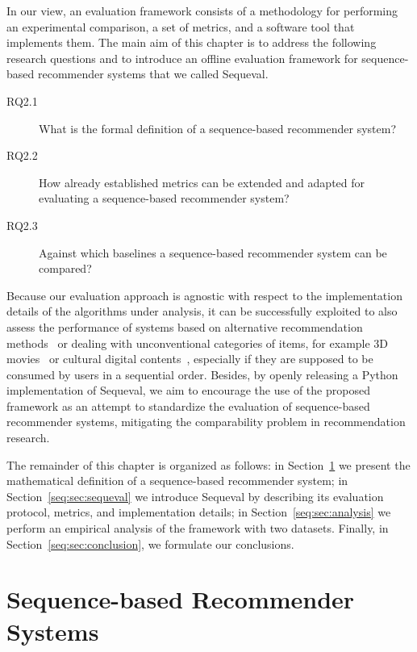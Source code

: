 In our view, an evaluation framework consists of a methodology for performing an experimental comparison, a set of metrics, and a software tool that implements them. The main aim of this chapter is to address the following research questions and to introduce an offline evaluation framework for sequence-based recommender systems that we called Sequeval.

\begin{description}
\item[RQ2.1\label{seq:itm:rq1}] What is the formal definition of a sequence-based recommender system?
\item[RQ2.2\label{seq:itm:rq2}] How already established metrics can be extended and adapted for evaluating a sequence-based recommender system?
\item[RQ2.3\label{seq:itm:rq3}] Against which baselines a sequence-based recommender system can be compared?
\end{description}

Because our evaluation approach is agnostic with respect to the implementation details of the algorithms under analysis, it can be successfully exploited to also assess the performance of systems based on alternative recommendation methods~\cite{Costa2011} or dealing with unconventional categories of items, for example 3D movies~\cite{Pouli2015} or cultural digital contents~\cite{Albanese2011}, especially if they are supposed to be consumed by users in a sequential order. Besides, by openly releasing a Python implementation of Sequeval, we aim to encourage the use of the proposed framework as an attempt to standardize the evaluation of sequence-based recommender systems, mitigating the comparability problem in recommendation research.

The remainder of this chapter is organized as follows: in Section~\ref{seq:sec:sequence-based} we present the mathematical definition of a sequence-based recommender system; in Section~\ref{seq:sec:sequeval} we introduce Sequeval by describing its evaluation protocol, metrics, and implementation details; in Section~\ref{seq:sec:analysis} we perform an empirical analysis of the framework with two datasets. Finally, in Section~\ref{seq:sec:conclusion}, we formulate our conclusions.

\section{Sequence-based Recommender Systems}
\label{seq:sec:sequence-based}

